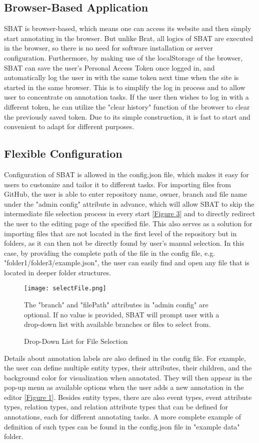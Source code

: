 \documentclass[12ptm a4paper]{article}
\begin{document}
\subsection{Browser-Based Application}
SBAT is browser-based, which means one can access its website and then simply start annotating in the browser. But unlike Brat, all logics of SBAT are executed in the browser, so there is no need for software installation or server configuration. Furthermore, by making use of the localStorage of the browser, SBAT can save the user's Personal Access Token once logged in, and automatically log the user in with the same token next time when the site is started in the same browser. This is to simplify the log in process and to allow user to concentrate on annotation tasks. If the user then wishes to log in with a different token, he can utilize the "clear history" function of the browser to clear the previously saved token. Due to its simple construction, it is fast to start and convenient to adapt for different purposes.

\subsection{Flexible Configuration}
Configuration of SBAT is allowed in the config.json file, which makes it easy for users to customize and tailor it to different tasks. For importing files from GitHub, the user is able to enter repository name, owner, branch and file name under the "admin config" attribute in advance, which will allow SBAT to skip the intermediate file selection process in every start [\hyperref[figure3]{Figure 3}] and to directly redirect the user to the editing page of the specified file. This also serves as a solution for importing files that are not located in the first level of the repository but in folders, as it can then not be directly found by user's manual selection. In this case, by
providing the complete path of the file in the config file, e.g. "folder1/folder3/example.json", the user can easily find and open any file that is located in deeper folder structures. \\
\begin{figure}[H]
{\centering
\texttt{[image: selectFile.png]}
\label{figure3}
\caption{Drop-Down List for File Selection}
}
{\scriptsize The "branch" and "filePath" attributes in "admin config" are optional. If no value is provided, SBAT will prompt user with a drop-down list with available branches or files to select from.\par}
\end{figure}
Details about annotation labels are also defined in the config file. For example, the user can define multiple entity types, their attributes, their children, and the background color for visualization when annotated. They will then appear in the pop-up menu as available options when the user adds a new annotation in the editor [\hyperref[figure1]{Figure 1}]. Besides entity types, there are also event types, event attribute types, relation types, and relation attribute types that can be defined for annotations, each for different annotating tasks.  A more complete example of definition of such types can be found in the config.json file in "example data" folder.
\end{document}
